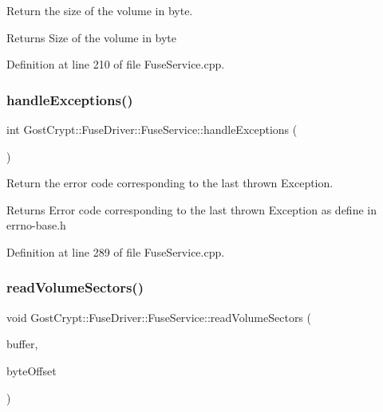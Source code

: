 Return the size of the volume in byte. 

\begin{DoxyReturn}{Returns}
Size of the volume in byte 
\end{DoxyReturn}


Definition at line 210 of file Fuse\+Service.\+cpp.

\mbox{\label{class_gost_crypt_1_1_fuse_driver_1_1_fuse_service_a028d4692dbaad0660a017b95e95e286e}} 
\subsubsection{\texorpdfstring{handle\+Exceptions()}{handleExceptions()}}
{\footnotesize\ttfamily int Gost\+Crypt\+::\+Fuse\+Driver\+::\+Fuse\+Service\+::handle\+Exceptions (\begin{DoxyParamCaption}{ }\end{DoxyParamCaption})\hspace{0.3cm}{\ttfamily [static]}}



Return the error code corresponding to the last thrown Exception. 

\begin{DoxyReturn}{Returns}
Error code corresponding to the last thrown Exception as define in errno-\/base.\+h 
\end{DoxyReturn}


Definition at line 289 of file Fuse\+Service.\+cpp.

\mbox{\label{class_gost_crypt_1_1_fuse_driver_1_1_fuse_service_a083ec1d770ff1f0f45e466e9e1e50dbf}} 
\subsubsection{\texorpdfstring{read\+Volume\+Sectors()}{readVolumeSectors()}}
{\footnotesize\ttfamily void Gost\+Crypt\+::\+Fuse\+Driver\+::\+Fuse\+Service\+::read\+Volume\+Sectors (\begin{DoxyParamCaption}\item[{\hyperlink{class_gost_crypt_1_1_buffer_ptr}{Buffer\+Ptr} \&}]{buffer,  }\item[{quint64}]{byte\+Offset }\end{DoxyParamCaption})\hspace{0.3cm}{\ttfamily [static]}}



